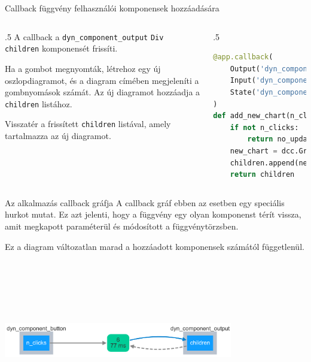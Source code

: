 \documentclass[english, aspectratio=169]{beamer}
\begin{document}
\begin{frame}[fragile]{Callback függvény felhasználói komponensek hozzáadására}
	\begin{columns}
		\begin{column}{.5\textwidth}
			A callback a \texttt{dyn\_component\_output} \texttt{Div} \texttt{children} komponensét frissíti.\par\medskip
			Ha a gombot megnyomták, létrehoz egy új oszlopdiagramot, és a diagram címében megjeleníti a gombnyomások számát.
			Az új diagramot hozzáadja a \texttt{children} listához.\par\medskip
			Visszatér a frissített \texttt{children} listával, amely tartalmazza az új diagramot.
		\end{column}
		\begin{column}{.5\textwidth}
			\begin{lstlisting}[language=python]
@app.callback(
	Output('dyn_component_output', 'children'),
	Input('dyn_component_button', 'n_clicks'),
	State('dyn_component_output', 'children')
)
def add_new_chart(n_clicks, children):
	if not n_clicks:
		return no_update
	new_chart = dcc.Graph(figure=px.bar(title=f"Diagram {n_clicks}"))
	children.append(new_chart)
	return children

			\end{lstlisting}
		\end{column}
	\end{columns}
\end{frame}

\begin{frame}{Az alkalmazás callback gráfja}
	A callback gráf ebben az esetben egy speciális hurkot mutat. Ez azt jelenti, hogy a függvény egy olyan komponenst térít vissza, amit megkapott paraméterül és módosított a függvénytörzsben.\par\smallskip
	Ez a diagram változatlan marad a hozzáadott komponensek számától függetlenül.
	\vspace{1cm}
	\begin{center}
		\includegraphics[width=10cm, height=7cm, keepaspectratio]{images/adv_2.png}
	\end{center}
\end{frame}
\end{document}
